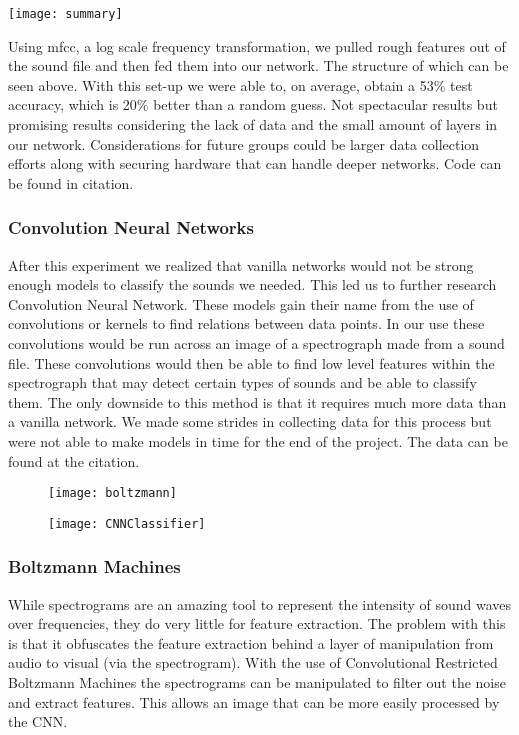 \begin{center}
	\texttt{[image: summary]}
\end{center}

Using mfcc, a log scale frequency transformation, we pulled rough features out of the sound file and then fed them into our network. The structure of which can be seen above. With this set-up we were able to, on average, obtain a 53\% test accuracy, which is 20\% better than a random guess. Not spectacular results but promising results considering the lack of data and the small amount of layers in our network. Considerations for future groups could be larger data collection efforts along with securing hardware that can handle deeper networks. Code can be found in citation.\cite{ot}

\subsubsection{Convolution Neural Networks}
After this experiment we realized that vanilla networks would not be strong enough models to classify the sounds we needed. This led us to further research Convolution Neural Network. These models gain their name from the use of convolutions or kernels to find relations between data points. In our use these convolutions would be run across an image of a spectrograph made from a sound file. These convolutions would then be able to find low level features within the spectrograph that may detect certain types of sounds and be able to classify them. The only downside to this method is that it requires much more data than a vanilla network. We made some strides in collecting data for this process but were not able to make models in time for the end of the project. The data can be found at the citation.\cite{soundData}

\begin{figure}
	\centering
	\begin{minipage}{.5\textwidth}
		\centering
		\texttt{[image: boltzmann]}
		\label{fig:test1}
	\end{minipage}%
	\begin{minipage}{.5\textwidth}
		\centering
		\texttt{[image: CNNClassifier]}
		\label{fig:test2}
	\end{minipage}
\end{figure}

\subsubsection{Boltzmann Machines}
While spectrograms are an amazing tool to represent the intensity of sound waves over frequencies, they do very little for feature extraction. The problem with this is that it obfuscates the feature extraction behind a layer of manipulation from audio to visual (via the spectrogram). With the use of Convolutional Restricted Boltzmann Machines the spectrograms can be manipulated to filter out the noise and extract features. This allows an image that can be more easily processed by the CNN.


